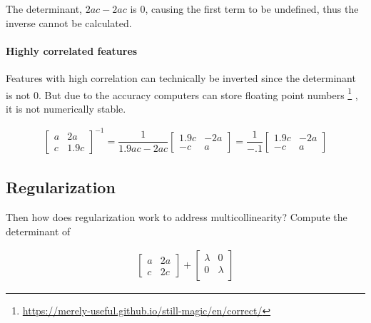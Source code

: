 \documentclass[10pt,letterpaper,twoside]{article}
\begin{document}
The determinant, $2ac - 2ac$ is 0, causing the first term to be undefined,
thus the inverse cannot be calculated.

\paragraph{Highly correlated features}

Features with high correlation can technically be inverted since the determinant is not 0.
But due to the accuracy computers can store floating point numbers
\footnote{\url{https://merely-useful.github.io/still-magic/en/correct/}}
,
it is not numerically stable.

\begin{align}
\begin{bmatrix}
a & 2a \\
c & 1.9c
\end{bmatrix}^{-1}
=
\dfrac{1}{1.9ac - 2ac}
\begin{bmatrix}
1.9c & -2a \\
-c & a
\end{bmatrix}
=
\dfrac{1}{-.1}
\begin{bmatrix}
1.9c & -2a \\
-c & a
\end{bmatrix}
\end{align}

\subsection{Regularization}

Then how does regularization work to address multicollinearity? Compute the determinant of 

\begin{align}
    \begin{bmatrix}
    a & 2a \\
    c & 2c
    \end{bmatrix}
    +
    \begin{bmatrix}
    \lambda & 0 \\
    0 & \lambda \\
    \end{bmatrix}
\end{align}
\end{document}
